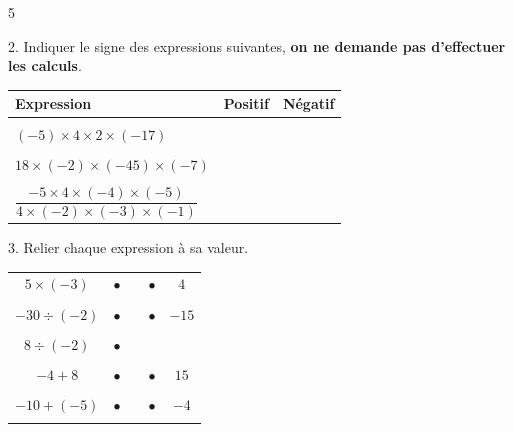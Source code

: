 \documentclass[a4paper]{book}
\begin{document}
{\begin{exerciceNote}{5}
\begin{enumerate}[leftmargin=*]
            \bigskip


            \begin{minipage}[b]{0.45\linewidth}
                2. Indiquer le signe des expressions suivantes, \textbf{on ne demande pas d'effectuer les calculs}.

                \medskip
    
                \begin{tabular}{|l|c|c|}
                    \hline
                    Expression & Positif & Négatif\\[2ex] 
                    \hline & & \\
                    $(-5)\times4\times2\times(-17)$ & & \\[2ex] 
                    \hline & &\\
                    $18\times(-2)\times(-45)\times(-7)$ & & \\[2ex]
                    \hline & &\\
                    $\dfrac{-5\times4\times(-4)\times(-5)}{4\times(-2)\times(-3)\times(-1)}$ & & \\[2ex]
                    \hline
                \end{tabular}
            \end{minipage}
            \hfill \vline\hfill
            \begin{minipage}{0.45\linewidth}
                3. Relier chaque expression à sa valeur.

                \bigskip

                \begin{tabular}{ccp{1cm}cc}
                    $5\times(-3)$   & $\bullet$   & & $\bullet$ & $4$ \\ \\

                    $-30\div(-2)$   & $\bullet$   & & $\bullet$ & $-15$ \\ \\

                    $8\div(-2)$     & $\bullet$   & &  \\ \\

                    $-4+8$          & $\bullet$   & & $\bullet$ & $15$  \\ \\

                $-10 +(-5)$         & $\bullet$   & & $\bullet$ & $-4$ \\ \\
                \end{tabular}


\end{minipage}
\end{enumerate}
\end{exerciceNote}}
\end{document}
